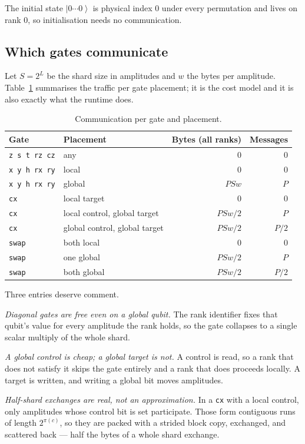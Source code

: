 \documentclass[11pt]{article}
\newcommand{\ket}[1]{\left|#1\right\rangle}
\begin{document}
The initial state $\ket{0\cdots 0}$ is physical index $0$ under every
permutation and lives on rank $0$, so initialisation needs no communication.

\subsection{Which gates communicate}

Let $S = 2^{L}$ be the shard size in amplitudes and $w$ the bytes per
amplitude. Table~\ref{tab:costs} summarises the traffic per gate placement;
it is the cost model and it is also exactly what the runtime does.

\begin{table}[t]
\centering
\begin{tabular}{llrr}
\toprule
Gate & Placement & Bytes (all ranks) & Messages \\
\midrule
\texttt{z s t rz cz} & any & $0$ & $0$ \\
\texttt{x y h rx ry} & local & $0$ & $0$ \\
\texttt{x y h rx ry} & global & $P S w$ & $P$ \\
\texttt{cx} & local target & $0$ & $0$ \\
\texttt{cx} & local control, global target & $P S w / 2$ & $P$ \\
\texttt{cx} & global control, global target & $P S w / 2$ & $P/2$ \\
\texttt{swap} & both local & $0$ & $0$ \\
\texttt{swap} & one global & $P S w / 2$ & $P$ \\
\texttt{swap} & both global & $P S w / 2$ & $P/2$ \\
\bottomrule
\end{tabular}
\caption{Communication per gate and placement.}
\label{tab:costs}
\end{table}

Three entries deserve comment.

\emph{Diagonal gates are free even on a global qubit.} The rank identifier
fixes that qubit's value for every amplitude the rank holds, so the gate
collapses to a single scalar multiply of the whole shard.

\emph{A global control is cheap; a global target is not.} A control is read,
so a rank that does not satisfy it skips the gate entirely and a rank that does
proceeds locally. A target is written, and writing a global bit moves
amplitudes.

\emph{Half-shard exchanges are real, not an approximation.} In a \texttt{cx}
with a local control, only amplitudes whose control bit is set participate.
Those form contiguous runs of length $2^{\pi(c)}$, so they are packed with a
strided block copy, exchanged, and scattered back --- half the bytes of a whole
shard exchange.
\end{document}

